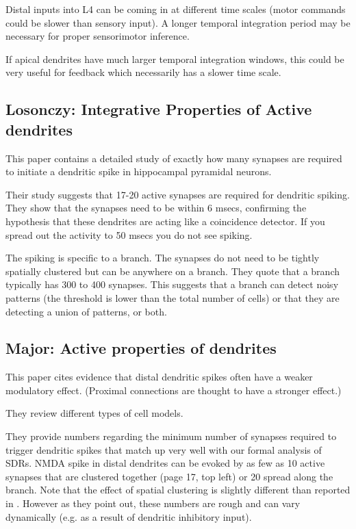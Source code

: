 \documentclass{article} %
\begin{document}
Distal inputs into L4 can be coming in at different time scales (motor commands
could be slower than sensory input). A longer temporal integration period may be
necessary for proper sensorimotor inference.

If apical dendrites have much larger temporal integration windows, this could be
very useful for feedback which necessarily has a slower time scale.

\subsection{Losonczy: Integrative Properties of Active dendrites}

This paper \cite{Losonczy2006} contains a detailed study of exactly how many
synapses are required to initiate a dendritic spike in hippocampal pyramidal
neurons.

Their study suggests that 17-20 active synapses are required for
dendritic spiking. They show that the synapses need to be within 6 msecs,
confirming the hypothesis that these dendrites are acting like a coincidence
detector.  If you spread out the activity to 50 msecs you do not see spiking.

The spiking is specific to a branch. The synapses do not need to be
tightly spatially clustered but can be anywhere on a branch. They quote that
a branch typically has 300 to 400 synapses. This suggests that a branch can
detect noisy patterns (the threshold is lower than the total number of cells)
or that they are detecting a union of patterns, or both.

\subsection{Major: Active properties of dendrites}

This paper \cite{Major2013} cites evidence that distal dendritic spikes often
have a weaker modulatory effect. (Proximal connections are thought to have a
stronger effect.)

They review different types of cell models.

They provide numbers regarding the minimum number of synapses required to
trigger dendritic spikes that match up very well with our formal analysis of
SDRs.  NMDA spike in distal dendrites can be evoked by as few as 10 active
synapses that are clustered together (page 17, top left) or 20 spread along
the branch. Note that the effect of spatial clustering is slightly different
than reported in \cite{Losonczy2006}.  However as they point out,
these numbers are rough and can vary dynamically (e.g. as a result of
dendritic inhibitory input).
\end{document}
